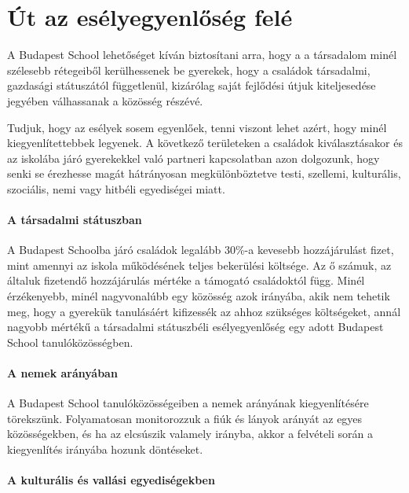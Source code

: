 \hypertarget{ut-az-eselyegyenloseg-fele}{%
\section{Út az esélyegyenlőség felé}\label{ut-az-eselyegyenloseg-fele}}

A Budapest School lehetőséget kíván biztosítani arra, hogy a a
társadalom minél szélesebb rétegeiből kerülhessenek be gyerekek, hogy a
családok társadalmi, gazdasági státuszától függetlenül, kizárólag saját
fejlődési útjuk kiteljesedése jegyében válhassanak a közösség részévé.

Tudjuk, hogy az esélyek sosem egyenlőek, tenni viszont lehet azért, hogy
minél kiegyenlítettebbek legyenek. A következő területeken a családok
kiválasztásakor és az iskolába járó gyerekekkel való partneri
kapcsolatban azon dolgozunk, hogy senki se érezhesse magát hátrányosan
megkülönböztetve testi, szellemi, kulturális, szociális, nemi vagy
hitbéli egyediségei miatt.

\hypertarget{a-tarsadalmi-statuszban}{%
\paragraph{A társadalmi státuszban}\label{a-tarsadalmi-statuszban}}

A Budapest Schoolba járó családok legalább 30\%-a kevesebb hozzájárulást
fizet, mint amennyi az iskola működésének teljes bekerülési költsége. Az
ő számuk, az általuk fizetendő hozzájárulás mértéke a támogató
családoktól függ. Minél érzékenyebb, minél nagyvonalúbb egy közösség
azok irányába, akik nem tehetik meg, hogy a gyerekük tanulásáért
kifizessék az ahhoz szükséges költségeket, annál nagyobb mértékű a
társadalmi státuszbéli esélyegyenlőség egy adott Budapest School
tanulóközösségben.

\hypertarget{a-nemek-aranyaban}{%
\paragraph{A nemek arányában}\label{a-nemek-aranyaban}}

A Budapest School tanulóközösségeiben a nemek arányának
kiegyenlítésére törekszünk. Folyamatosan monitorozzuk a fiúk és lányok arányát az egyes
közösségekben, és ha az elcsúszik valamely irányba, akkor a
felvételi során a kiegyenlítés irányába hozunk döntéseket.

\hypertarget{a-kulturalis-es-vallasi-egyedisegekben}{%
\paragraph{A kulturális és vallási
egyediségekben}\label{a-kulturalis-es-vallasi-egyedisegekben}}

